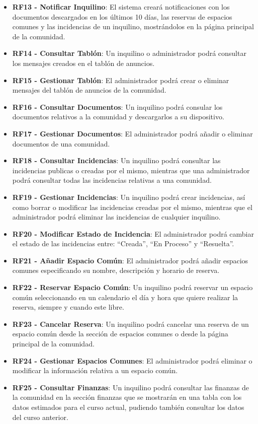 \begin{itemize}
	\item \textbf{RF13 - Notificar Inquilino}: El sistema creará notificaciones con los documentos descargados en los últimos 10 días, las reservas de espacios comunes y las incidencias de un inquilino, mostrándolos en la página principal de la comunidad.
	\item \textbf{RF14 - Consultar Tablón}: Un inquilino o administrador podrá consultar los mensajes creados en el tablón de anuncios.
	\item \textbf{RF15 - Gestionar Tablón}: El administrador podrá crear o eliminar mensajes del tablón de anuncios de la comunidad.
	\item \textbf{RF16 - Consultar Documentos}: Un inquilino podrá consular los documentos relativos a la comunidad y descargarlos a su dispositivo.
	\item \textbf{RF17 - Gestionar Documentos}: El administrador podrá añadir o eliminar documentos de una comunidad.
	\item \textbf{RF18 - Consultar Incidencias}: Un inquilino podrá consultar las incidencias publicas o creadas por el mismo, mientras que una administrador podrá consultar todas las incidencias relativas a una comunidad.
	\item \textbf{RF19 - Gestionar Incidencias}: Un inquilino podrá crear incidencias, así como borrar o modificar las incidencias creadas por el mismo, mientras que el administrador podrá eliminar las incidencias de cualquier inquilino.
	\item \textbf{RF20 - Modificar Estado de Incidencia}: El administrador podrá cambiar el estado de las incidencias entre: ``Creada'', ``En Proceso'' y ``Resuelta''.
	\item \textbf{RF21 - Añadir Espacio Común}: El administrador podrá añadir espacios comunes especificando su nombre, descripción y horario de reserva.
	\item \textbf{RF22 - Reservar Espacio Común}: Un inquilino podrá reservar un espacio común seleccionando en un calendario el día y hora que quiere realizar la reserva, siempre y cuando este libre.
	\item \textbf{RF23 - Cancelar Reserva}: Un inquilino podrá cancelar una reserva de un espacio común desde la sección de espacios comunes o desde la página principal de la comunidad.
	\item \textbf{RF24 - Gestionar Espacios Comunes}: El administrador podrá eliminar o modificar la información relativa a un espacio común.
	\item \textbf{RF25 - Consultar Finanzas}: Un inquilino podrá consultar las finanzas de la comunidad en la sección finanzas que se mostrarán en una tabla con los datos estimados para el curso actual, pudiendo también consultar los datos del curso anterior.

\end{itemize}
